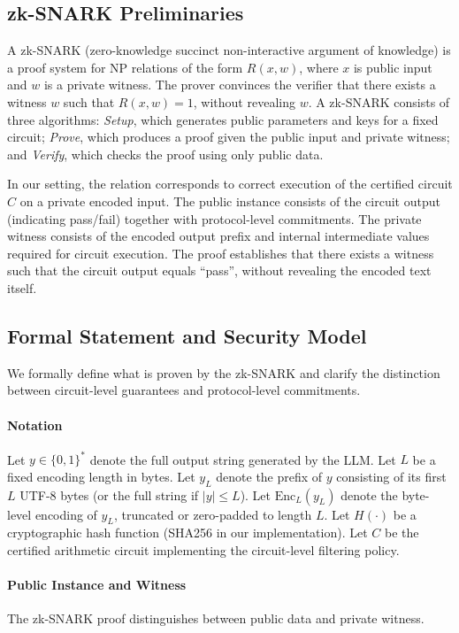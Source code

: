 \documentclass[10pt,conference,a4paper]{IEEEtran}
\begin{document}
\subsection{zk-SNARK Preliminaries}

A zk-SNARK (zero-knowledge succinct non-interactive argument of knowledge) is a proof system for NP relations of the form 
$R(x, w)$, where $x$ is public input and $w$ is a private witness. 
The prover convinces the verifier that there exists a witness $w$ such that $R(x, w) = 1$, without revealing $w$. 
A zk-SNARK consists of three algorithms: \textit{Setup}, which generates public parameters and keys for a fixed circuit; 
\textit{Prove}, which produces a proof given the public input and private witness; and \textit{Verify}, which checks the proof using only public data.

In our setting, the relation corresponds to correct execution of the certified circuit $C$ on a private encoded input. 
The public instance consists of the circuit output (indicating pass/fail) together with protocol-level commitments. 
The private witness consists of the encoded output prefix and internal intermediate values required for circuit execution. 
The proof establishes that there exists a witness such that the circuit output equals ``pass'', without revealing the encoded text itself.

\subsection{Formal Statement and Security Model}

We formally define what is proven by the zk-SNARK and clarify the distinction between circuit-level guarantees and protocol-level commitments.

\paragraph{Notation}
Let $y \in \{0,1\}^*$ denote the full output string generated by the LLM.  
Let $L$ be a fixed encoding length in bytes.  
Let $y_L$ denote the prefix of $y$ consisting of its first $L$ UTF-8 bytes (or the full string if $|y| \le L$).  
Let $\mathrm{Enc}_L(y_L)$ denote the byte-level encoding of $y_L$, truncated or zero-padded to length $L$.  
Let $H(\cdot)$ be a cryptographic hash function (SHA256 in our implementation).  
Let $C$ be the certified arithmetic circuit implementing the circuit-level filtering policy.  

\paragraph{Public Instance and Witness}
The zk-SNARK proof distinguishes between public data and private witness.
\end{document}
